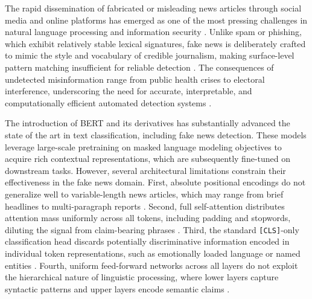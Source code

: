 \documentclass[conference]{IEEEtran}
\begin{document}
The rapid dissemination of fabricated or misleading news articles through social media and online platforms has emerged as one of the most pressing challenges in natural language processing and information security \cite{shu2017fake, zhou2020survey}. Unlike spam or phishing, which exhibit relatively stable lexical signatures, fake news is deliberately crafted to mimic the style and vocabulary of credible journalism, making surface-level pattern matching insufficient for reliable detection \cite{thorne2018fever}. The consequences of undetected misinformation range from public health crises to electoral interference, underscoring the need for accurate, interpretable, and computationally efficient automated detection systems \cite{vosoughi2018spread}.

The introduction of BERT \cite{devlin2019bert} and its derivatives has substantially advanced the state of the art in text classification, including fake news detection. These models leverage large-scale pretraining on masked language modeling objectives to acquire rich contextual representations, which are subsequently fine-tuned on downstream tasks. However, several architectural limitations constrain their effectiveness in the fake news domain. First, absolute positional encodings do not generalize well to variable-length news articles, which may range from brief headlines to multi-paragraph reports \cite{su2021rope}. Second, full self-attention distributes attention mass uniformly across all tokens, including padding and stopwords, diluting the signal from claim-bearing phrases \cite{zaheer2020bigbird}. Third, the standard \texttt{[CLS]}-only classification head discards potentially discriminative information encoded in individual token representations, such as emotionally loaded language or named entities \cite{liu2019roberta}. Fourth, uniform feed-forward networks across all layers do not exploit the hierarchical nature of linguistic processing, where lower layers capture syntactic patterns and upper layers encode semantic claims \cite{tenney2019bert}.
\end{document}
